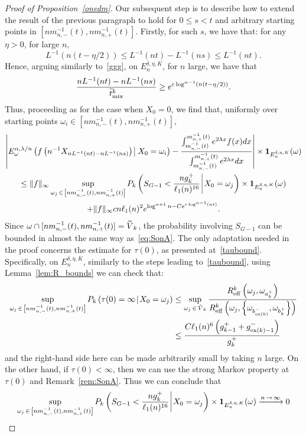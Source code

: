 \documentclass[AHL,Unicode,longabstracts,published]{cedram}
\newcommand{\bfun}{\mathbf{1}}
\newcommand{\mix}{\mathrm{mix}}
\newcommand{\eff}{\mathrm{eff}}
\newcommand{\Pk}{{P_k}}
\newcommand\ex{\operatorname{ex}}
\newcommand{\bt}[1]{b_{\ex(#1)}^-}
\newcommand{\gtt}[1]{g_{\ex(#1)-1}^-}
\newcommand{\B}{{16}}
\let\oldtilde\tilde
\renewcommand*{\tilde}[1]{\mathchoice{\widetilde{#1}}{\widetilde{#1}}{\oldtilde{#1}}{\oldtilde{#1}}}
\begin{document}
\begin{proof}[Proof of Proposition~\ref{onedm}]
Our subsequent step is to describe how to extend the result of the previous paragraph to hold for $0\leq s<t$ and arbitrary starting points in $[nm_{n,-}^{-1}(t),nm_{n,+}^{-1}(t)]$. Firstly, for such $s$, we have that: for any $\eta>0$, for large $n$,
\[
L^{-1}\left(n(t-\eta/2)\right)\leq L^{-1}(nt)-L^{-1}(ns)\leq L^{-1}(nt).
\]
Hence, arguing similarly to~\eqref{ggg}, on $E_n^{\delta,\eta,K}$, for $n$ large, we have that
\[
\frac{nL^{-1}(nt)-nL^{-1}(ns)}{\tilde{t}^k_{\mix}}\geq e^{c\log^{\alpha-1} (n(t-\eta/2))}.
\]
Thus, proceeding as for the case when $X_0=0$, we find that, uniformly over starting points $\omega_i\in [nm_{n,-}^{-1}(t),nm_{n,+}^{-1}(t)]$,
\begin{multline*}
{\left|{E}^{\alpha,\lambda/n}_\omega\left(f\left(n^{-1}{X}_{nL^{-1}(nt)-nL^{-1}(ns)}\right)\:\vline\:X_0=\omega_i\right)-\frac{\int_{m_{n,-}^{-1}(t)}^{m_{n,+}^{-1}(t)}e^{2\lambda x}f(x)dx}{\int_{m_{n,-}^{-1}(t)}^{m_{n,+}^{-1}(t)}e^{2\lambda x}dx}\right|\times\bfun_{E_n^{\delta,\eta,K}}(\omega)}\\
\leq \|f\|_\infty\sup_{\omega_j\,\in \,\left[nm_{n,-}^{-1}(t),nm_{n,+}^{-1}(t)\right]}{P}_k\left(S_{G-1}<\frac{ng_k^+}{\ell_1(n)^{\B}}\:\vline\:X_0=\omega_j\right)\times\bfun_{E_n^{\delta,\eta,K}}(\omega)\\
+\|f\|_\infty c n\ell_1(n)^2 e^{\log^{\alpha+1}n-Ce^{c\log^{\alpha-1} (nt)}}.
\end{multline*}
Since $\omega\cap[nm_{n,-}^{-1}(t),nm_{n,+}^{-1}(t)]=\tilde{V}_k$, the probability involving $S_{G-1}$ can be bounded in almost the same way as~\eqref{eq:SonA}. The only adaptation needed in the proof concerns the estimate for $\tau(0)$, as presented at~\eqref{taubound}. Specifically, on $E_n^{\delta,\eta,K}$, similarly to the steps leading to~\eqref{taubound}, using Lemma~\ref{lem:R_bounds} we can check that:
\begin{align*}
\sup_{\omega_j\,\in\,\left[nm_{n,-}^{-1}(t),nm_{n,+}^{-1}(t)\right]}\Pk\left(\tau(0)=\infty\:\vline\:X_0=\omega_j\right)&\leq
\sup_{\omega_j\,\in\,\tilde{V}_k}\frac{{R}^k_\eff\left(\omega_j,\omega_{a_k^+}\right)}{{R}^k_\eff\left(\omega_j,\left\{\omega_{\bt{k}},\omega_{{b}_k^+}\right\}\right)}\\
&\leq \frac{C\ell_1(n)^6\left(g_{k-1}^++\gtt{k}\right)}{g_k^+}
\end{align*}
and the right-hand side here can be made arbitrarily small by taking $n$ large. On the other hand, if $\tau(0)<\infty$, then we can use the strong Markov property at $\tau(0)$ and Remark~\ref{rem:SonA}. Thus we can conclude that
\[
\sup_{\omega_j\,\in\,\left[nm_{n,-}^{-1}(t),nm_{n,+}^{-1}(t)\right]}{P}_k\left(S_{G-1}<\frac{ng_k^+}{\ell_1(n)^{\B}}\:\vline\:X_0=\omega_j\right)\times\bfun_{E_n^{\delta,\eta,K}}(\omega)\xrightarrow{n\,\to\,\infty} 0
\]
\end{proof}
\end{document}
